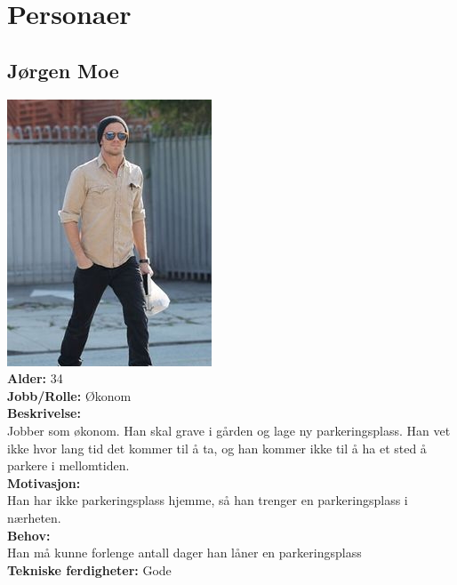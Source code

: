 \documentclass[12pt]{article}
\begin{document}
\section{Personaer}

    \subsection{Jørgen Moe}
    \includegraphics[scale=1]{bilder/personaer/persona_jorgen.jpg}\\
    \textbf{Alder:} 34\\
    \textbf{Jobb/Rolle:}
    Økonom\\
    \textbf{Beskrivelse:}\\
    Jobber som økonom. Han skal grave i gården og lage ny parkeringsplass. Han vet ikke hvor lang tid det kommer til å ta, og han kommer ikke til å ha et sted å parkere i mellomtiden.\\
    \textbf{Motivasjon:}\\
    Han har ikke parkeringsplass hjemme, så han trenger en parkeringsplass i nærheten.\\
    \textbf{Behov:}\\
    Han må kunne forlenge antall dager han låner en parkeringsplass\\
    \textbf{Tekniske ferdigheter:} Gode
    
\end{document}
